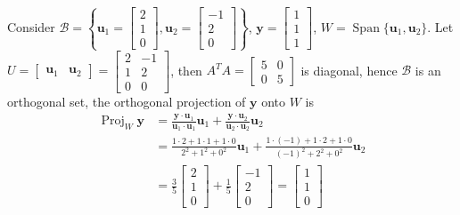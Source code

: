 \documentclass{beamer}
\DeclareMathOperator{\Proj}{Proj}
\theoremstyle{definition}
\theoremstyle{remark}
\DeclareMathOperator{\Span}{Span}
\begin{document}
\begin{frame}[t]
\begin{example}
Consider $\mathcal B=\left\{\mathbf u_1=\begin{bmatrix}
2\\1\\0
\end{bmatrix},\mathbf u_2=\begin{bmatrix}
-1\\2\\0
\end{bmatrix}\right\}$, $\mathbf y=\begin{bmatrix}
1\\1\\1
\end{bmatrix}$, $W=\Span\{\mathbf u_1,\mathbf u_2\}$\pause. Let $U=\begin{bmatrix}
\mathbf u_1&\mathbf u_2
\end{bmatrix}=\begin{bmatrix}
2&-1\\
1&2\\
0&0
\end{bmatrix}$, then $A^TA=\begin{bmatrix}
5&0\\
0&5
\end{bmatrix}$ is diagonal, hence $\mathcal B$ is an orthogonal set\pause, the orthogonal projection of $\mathbf y$ onto $W$ is
\begin{align*}
\Proj_W\mathbf y&=\frac{\mathbf y\cdot\mathbf u_1}{\mathbf u_1\cdot\mathbf u_1}\mathbf u_1+\frac{\mathbf y\cdot\mathbf u_2}{\mathbf u_2\cdot\mathbf u_2}\mathbf u_2\\
&=\frac{1\cdot2+1\cdot1+1\cdot0}{2^2+1^2+0^2}\mathbf u_1+\frac{1\cdot(-1)+1\cdot2+1\cdot0}{(-1)^2+2^2+0^2}\mathbf u_2\\
&=\frac{3}{5}\begin{bmatrix}
2\\1\\0
\end{bmatrix}+\frac{1}{5}\begin{bmatrix}
-1\\2\\0
\end{bmatrix}=\begin{bmatrix}
1\\1\\0
\end{bmatrix}
\end{align*}
\end{example}
\end{frame}
\end{document}
